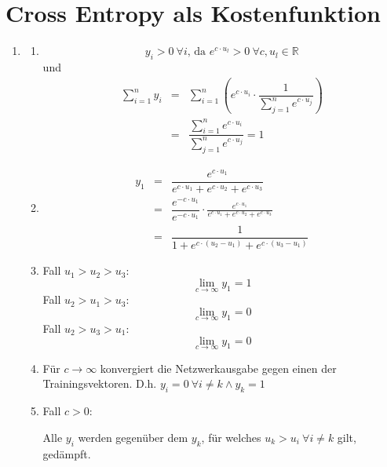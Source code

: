 \documentclass[DIN, pagenumber=false, fontsize=11pt, parskip=half]{scrartcl}
\begin{document}
	\section{Cross Entropy als Kostenfunktion}
	\begin{enumerate}
		\item
			\begin{enumerate}[label=(\alph*)]
				\item
					\begin{equation*}
							y_i > 0 \ \forall i \text{, da } e^{c\cdot u_l} > 0 \ \forall c, u_l \in \mathbb{R}
					\end{equation*}
					und 
					\begin{eqnarray*}
							\sum_{i=1}^{n}{y_i} &=& \sum_{i=1}^{n}{\left( e^{c\cdot u_i} \cdot \dfrac{1}{\sum_{j=1}^{n}{e^{c\cdot u_j}}} \right)} \\
							&=& \dfrac{\sum_{i=1}^{n}{e^{c\cdot u_i}}} {\sum_{j=1}^{n}{e^{c\cdot u_j}}} = 1
					\end{eqnarray*}
				\item
					\begin{eqnarray*}
							y_1 &=& \dfrac{e^{c \cdot u_1}}{e^{c \cdot u_1} + e^{c \cdot u_2} + e^{c \cdot u_3}} \\
							&=& \dfrac{e^{-c \cdot u_1}}{e^{-c \cdot u_1}} \cdot \frac{e^{c \cdot u_1}}{e^{c \cdot u_1} + e^{c \cdot u_2} + e^{c \cdot u_3}} \\
							&=& \dfrac{1}{1 + e^{c \cdot (u_2 - u_1)} + e^{c \cdot (u_3 - u_1)}}
					\end{eqnarray*}
				\item
					Fall $u_1 > u_2 > u_3$:
					\begin{equation*}
							\lim_{c\rightarrow \infty}y_1 = 1
					\end{equation*}
					Fall $u_2 > u_1 > u_3$:
					\begin{equation*}
							\lim_{c\rightarrow \infty}y_1 = 0
					\end{equation*}
					Fall $u_2 > u_3 > u_1$:
					\begin{equation*}
							\lim_{c\rightarrow \infty}y_1 = 0
					\end{equation*}
				\item
					Für $c \rightarrow \infty$ konvergiert die Netzwerkausgabe gegen einen der Trainingsvektoren. D.h. $y_i = 0 \  \forall i \neq k \wedge y_k = 1$
				\item
					Fall $c>0$: 

					Alle $y_i$ werden gegenüber dem $y_k$, für welches $u_k > u_i \ \forall i\neq k$ gilt, gedämpft.


\end{enumerate}
\end{enumerate}
\end{document}
